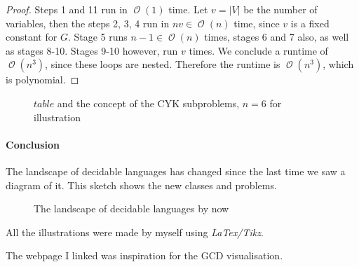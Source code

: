 \documentclass[10pt,fleqn]{article}
\theoremstyle{definition}
\theoremstyle{remark}
\newcommand{\pclass}{\text{P}}
\newcommand{\pathprob}{\text{PATH}}
\newcommand{\relprimeprob}{\text{RELPRIME}}
\newcommand{\cflclass}{\text{CFL}}
\DeclareMathOperator{\onot}{\mathcal{O}}
\begin{document}
\begin{proof}
Steps 1 and 11 run in \(\onot{(1)}\) time. Let \(v = |V|\) be the number of variables, then the steps 2, 3, 4 run in \(nv \in \onot{(n)}\) time, since \(v\) is a fixed constant for \(G\). Stage 5 runs \(n-1\in\onot{(n)}\) times, stages 6 and 7 also, as well as stages 8-10. Stages 9-10 however, run \(v\) times. We conclude a runtime of \(\onot{(n^3)}\), since these loops are nested. Therefore the runtime is \(\onot{(n^3)}\), which is polynomial.
\end{proof}
\begin{figure}[!hbtp]
    \centering
    \caption{\(table\) and the concept of the CYK subproblems, \(n = 6\) for illustration}
\end{figure}

\newpage

\paragraph*{Conclusion} The landscape of decidable languages has changed since the last time we saw a diagram of it. This sketch shows the new classes and problems.
\begin{figure}[!htbp]
    \large
    \centering
    \caption{The landscape of decidable languages by now}
\end{figure}

\nocite{*}
\renewcommand{\refname}{\normalsize References} 



All the illustrations were made by myself using \emph{LaTex/Tikz}.

The webpage I linked was inspiration for the GCD visualisation.
\end{document}

